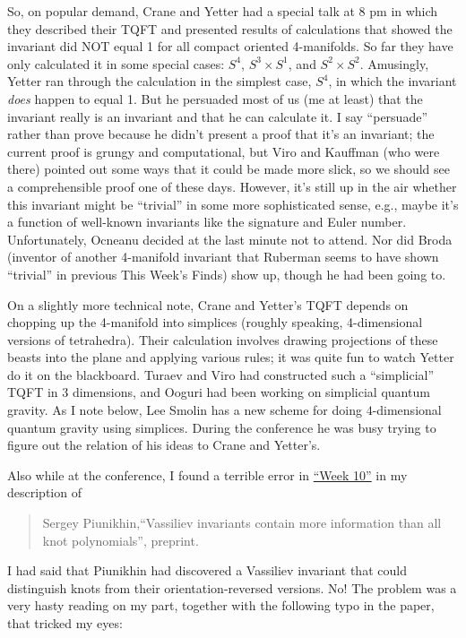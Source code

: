 \documentclass{article}
\begin{document}
So, on popular demand, Crane and Yetter had a special talk at 8 pm in
which they described their TQFT and presented results of calculations
that showed the invariant did NOT equal 1 for all compact oriented
4-manifolds. So far they have only calculated it in some special cases:
\(S^4\), \(S^3 \times S^1\), and \(S^2 \times S^2\). Amusingly, Yetter
ran through the calculation in the simplest case, \(S^4\), in which the
invariant \emph{does} happen to equal 1. But he persuaded most of us (me
at least) that the invariant really is an invariant and that he can
calculate it. I say ``persuade'' rather than prove because he didn't
present a proof that it's an invariant; the current proof is grungy and
computational, but Viro and Kauffman (who were there) pointed out some
ways that it could be made more slick, so we should see a comprehensible
proof one of these days. However, it's still up in the air whether this
invariant might be ``trivial'' in some more sophisticated sense, e.g.,
maybe it's a function of well-known invariants like the signature and
Euler number. Unfortunately, Ocneanu decided at the last minute not to
attend. Nor did Broda (inventor of another 4-manifold invariant that
Ruberman seems to have shown ``trivial'' in previous This Week's Finds)
show up, though he had been going to.

On a slightly more technical note, Crane and Yetter's TQFT depends on
chopping up the 4-manifold into simplices (roughly speaking,
4-dimensional versions of tetrahedra). Their calculation involves
drawing projections of these beasts into the plane and applying various
rules; it was quite fun to watch Yetter do it on the blackboard. Turaev
and Viro had constructed such a ``simplicial'' TQFT in 3 dimensions, and
Ooguri had been working on simplicial quantum gravity. As I note below,
Lee Smolin has a new scheme for doing \(4\)-dimensional quantum gravity
using simplices. During the conference he was busy trying to figure out
the relation of his ideas to Crane and Yetter's.

Also while at the conference, I found a terrible error in
\protect\hyperlink{week10}{``Week 10''} in my description of

\begin{quote}
{\rm Sergey Piunikhin,``Vassiliev invariants contain more information than all knot
polynomials'', preprint.}
\end{quote}

I had said that Piunikhin had discovered a Vassiliev invariant that
could distinguish knots from their orientation-reversed versions. No!
The problem was a very hasty reading on my part, together with the
following typo in the paper, that tricked my eyes:
\end{document}
